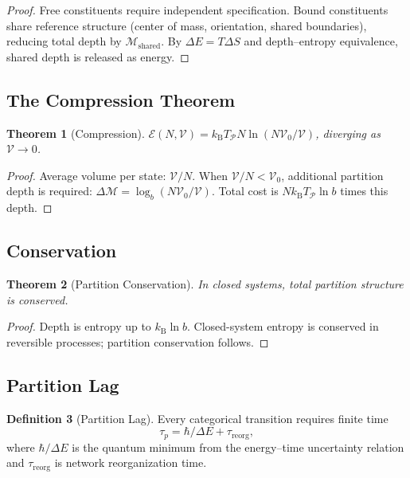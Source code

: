 \documentclass[twocolumn,10pt,a4paper]{article}
\newtheorem{theorem}{Theorem}[section]
\theoremstyle{definition}
\newtheorem{definition}[theorem]{Definition}
\theoremstyle{remark}
\newcommand{\kB}{k_{\mathrm{B}}}
\newcommand{\Depth}{\mathcal{M}}
\newcommand{\taup}{\tau_p}
\newcommand{\Partition}{\mathcal{P}}
\begin{document}
\begin{proof}
Free constituents require independent specification. Bound constituents share reference structure (center of mass, orientation, shared boundaries), reducing total depth by $\Depth_{\mathrm{shared}}$. By $\Delta E = T\Delta S$ and depth--entropy equivalence, shared depth is released as energy.
\end{proof}

\subsection{The Compression Theorem}

\begin{theorem}[Compression]
$\mathcal{E}(N,\mathcal{V}) = \kB T_\Partition N\ln(N\mathcal{V}_0/\mathcal{V})$, diverging as $\mathcal{V}\to 0$.
\end{theorem}

\begin{proof}
Average volume per state: $\mathcal{V}/N$. When $\mathcal{V}/N < \mathcal{V}_0$, additional partition depth is required: $\Delta\Depth = \log_b(N\mathcal{V}_0/\mathcal{V})$. Total cost is $N\kB T_\Partition\ln b$ times this depth.
\end{proof}

\subsection{Conservation}

\begin{theorem}[Partition Conservation]
In closed systems, total partition structure is conserved.
\end{theorem}

\begin{proof}
Depth is entropy up to $\kB\ln b$. Closed-system entropy is conserved in reversible processes; partition conservation follows.
\end{proof}

\subsection{Partition Lag}

\begin{definition}[Partition Lag]
Every categorical transition requires finite time
\begin{equation}
    \taup = \hbar/\Delta E + \tau_{\mathrm{reorg}},
\end{equation}
where $\hbar/\Delta E$ is the quantum minimum from the energy--time uncertainty relation and $\tau_{\mathrm{reorg}}$ is network reorganization time.
\end{definition}
\end{document}
